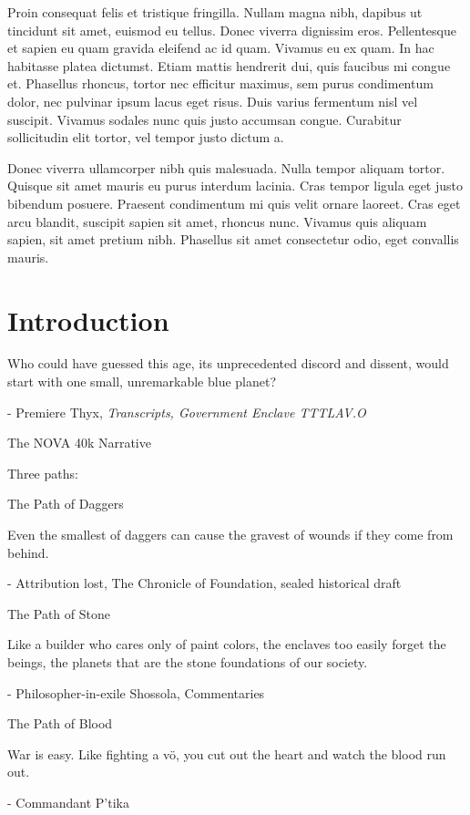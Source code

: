 \documentclass{novanarrative}
\begin{document}
Proin consequat felis et tristique fringilla. Nullam magna nibh, dapibus ut tincidunt sit amet, euismod eu tellus. Donec viverra dignissim eros. Pellentesque et sapien eu quam gravida eleifend ac id quam. Vivamus eu ex quam. In hac habitasse platea dictumst. Etiam mattis hendrerit dui, quis faucibus mi congue et. Phasellus rhoncus, tortor nec efficitur maximus, sem purus condimentum dolor, nec pulvinar ipsum lacus eget risus. Duis varius fermentum nisl vel suscipit. Vivamus sodales nunc quis justo accumsan congue. Curabitur sollicitudin elit tortor, vel tempor justo dictum a.

Donec viverra ullamcorper nibh quis malesuada. Nulla tempor aliquam tortor. Quisque sit amet mauris eu purus interdum lacinia. Cras tempor ligula eget justo bibendum posuere. Praesent condimentum mi quis velit ornare laoreet. Cras eget arcu blandit, suscipit sapien sit amet, rhoncus nunc. Vivamus quis aliquam sapien, sit amet pretium nibh. Phasellus sit amet consectetur odio, eget convallis mauris.

\chapter{Introduction}

Who could have guessed this age, its unprecedented discord and
dissent, would start with one small, unremarkable blue planet?

- Premiere Thyx, \textit{Transcripts, Government Enclave TTTLAV.O}




The NOVA 40k Narrative


Three paths:

The Path of Daggers

Even the smallest of daggers can cause the gravest of wounds if they
come from behind.

- Attribution lost, The Chronicle of Foundation, sealed historical draft


The Path of Stone

Like a builder who cares only of paint colors, the enclaves too easily
forget the beings, the planets that are the stone foundations of our
society.

- Philosopher-in-exile Shossola, Commentaries


The Path of Blood

War is easy.  Like fighting a v\"o, you cut out the heart and watch
the blood run out.

- Commandant P'tika
\end{document}
